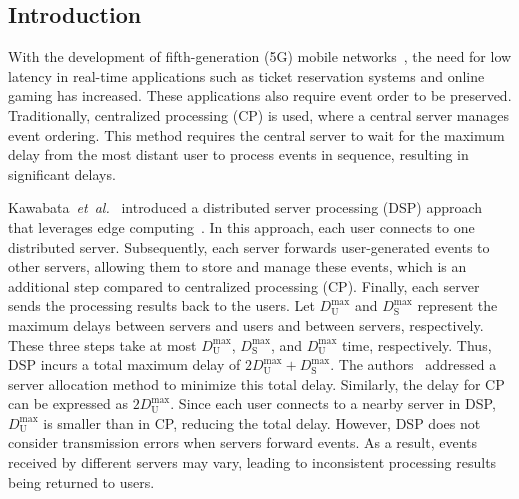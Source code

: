 \documentclass[10pt, letterpaper]{IEEEtran}
\begin{document}
\begin{CJK}{UTF8}{ipxm}
\section{Introduction}
\label{sec:introduction}

With the development of fifth-generation (5G) mobile networks~\cite{DOCOMO_5G}, the need for low latency in real-time applications such as ticket reservation systems and online gaming has increased.
These applications also require event order to be preserved.
Traditionally, centralized processing (CP) is used, where a central server manages event ordering.
This method requires the central server to wait for the maximum delay from the most distant user to process events in sequence, resulting in significant delays.

Kawabata~{\it et~al.}~\cite{2Kawabata2017} introduced a distributed server processing (DSP) approach that leverages edge computing~\cite{edge_26,edge_27,edge_28,edge_29}. 
In this approach, each user connects to one distributed server. 
Subsequently, each server forwards user-generated events to other servers, allowing them to store and manage these events, which is an additional step compared to centralized processing (CP). 
Finally, each server sends the processing results back to the users. 
Let $D_\mathrm{U}^{\max}$ and $D_\mathrm{S}^{\max}$ represent the maximum delays between servers and users and between servers, respectively. 
These three steps take at most $D_\mathrm{U}^{\max}$, $D_\mathrm{S}^{\max}$, and $D_\mathrm{U}^{\max}$ time, respectively. 
Thus, DSP incurs a total maximum delay of $2D_\mathrm{U}^{\max} + D_\mathrm{S}^{\max}$. 
The authors~\cite{2Kawabata2017} addressed a server allocation method to minimize this total delay. 
Similarly, the delay for CP can be expressed as $2D_\mathrm{U}^{\max}$. 
Since each user connects to a nearby server in DSP, $D_\mathrm{U}^{\max}$ is smaller than in CP, reducing the total delay. 
However, DSP does not consider transmission errors when servers forward events. 
As a result, events received by different servers may vary, leading to inconsistent processing results being returned to users.


\end{CJK}
\end{document}
